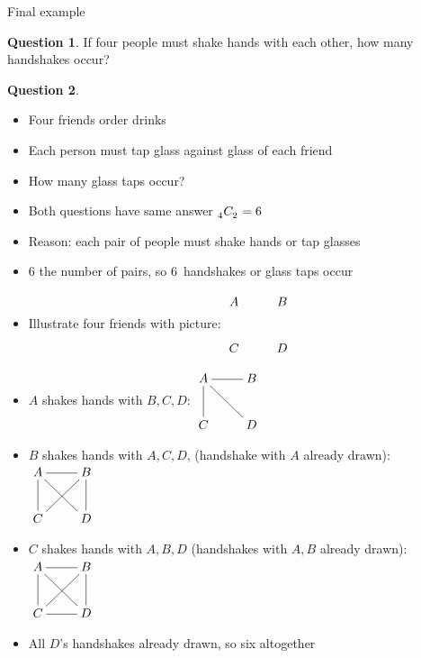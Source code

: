 \documentclass[handout]{beamer}
\theoremstyle{definition}
\newtheorem{question}{Question}
\newcommand\ncr[2]{\tensor[_{#1}]C{_{#2}}}
\begin{document}
\begin{frame}{Final example}
\begin{question}
If four people must shake hands with each other,
how many handshakes occur?
\end{question}
\begin{question}
\begin{itemize}
\item Four friends order drinks
\item Each person must tap glass against glass of each friend
\item How many glass taps occur?
\end{itemize}
\end{question}
\begin{itemize}
\item Both questions have same answer $\ncr{4}{2}=6$
\item Reason: each pair of people must shake hands or tap glasses
\item $6$ the number of pairs, so $6$~handshakes or glass taps occur
\end{itemize}
\end{frame}

\begin{frame}
\begin{itemize}
\item Illustrate four friends with picture:
$\vcenter{\begin{xy}\xymatrix{
A&B\\C&D}\end{xy}}$
\item $A$ shakes hands with $B,C,D$:
$\vcenter{\begin{xy}\xymatrix{
A\ar@{-}[r]\ar@{-}[d]\ar@{-}[dr]&B\\
C&D}\end{xy}}$
\item $B$ shakes hands with $A,C,D$,
(handshake with $A$ already drawn):
$\vcenter{\begin{xy}\xymatrix{
A\ar@{-}[r]\ar@{-}[d]\ar@{-}[dr]&B\ar@{-}[dl]\ar@{-}[d]\\
C&D}\end{xy}}$
\item $C$ shakes hands with $A,B,D$ (handshakes with
$A,B$ already drawn):
$\vcenter{\begin{xy}\xymatrix{
A\ar@{-}[r]\ar@{-}[d]\ar@{-}[dr]&B\ar@{-}[dl]\ar@{-}[d]\\
C\ar@{-}[r]&D}\end{xy}}$
\item All $D$'s handshakes already drawn, so six altogether
\end{itemize}
\end{frame}
\end{document}
